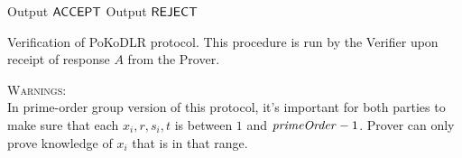 \begin{algorithm}[H]\label{verifyPoKoDLR}
\dontprintsemicolon

\BlankLine

 \;
\Indp
    {Output $\mathsf{ACCEPT}$ \;}
  \Else
    {Output $\mathsf{REJECT}$ \;}
\Indm

\caption{Verification of PoKoDLR protocol. This procedure is run by the Verifier upon receipt of response $A$ from the Prover.}
\end{algorithm}
 



\textsc{Warnings}:\\
In prime-order group version of this protocol, it's important for both parties to make sure that each $x_i,r,s_i,t$ is between $1$ and $ \mathit{primeOrder}-1 $. Prover can only prove knowledge of $x_i$ that is in that range.

